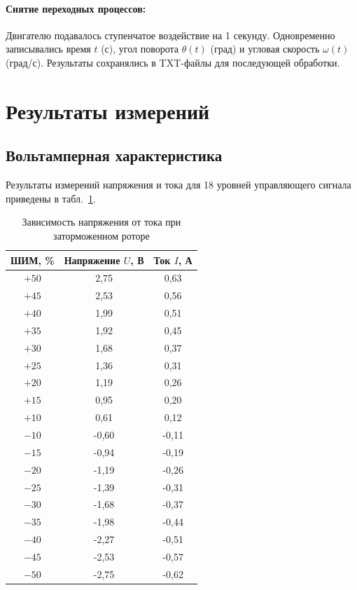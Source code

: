 \documentclass[a4paper, 12pt]{article}
\begin{document}
\paragraph{Снятие переходных процессов:}
Двигателю подавалось ступенчатое воздействие на 1 секунду. Одновременно записывались время $t$ (с), угол поворота $\theta(t)$ (град) и угловая скорость $\omega(t)$ (град/с). Результаты сохранялись в TXT-файлы для последующей обработки.

\section{Результаты измерений}

\subsection{Вольтамперная характеристика}

Результаты измерений напряжения и тока для 18 уровней управляющего сигнала приведены в табл.~\ref{tab:ui}.

\begin{table}[H]
    \centering
    \caption{Зависимость напряжения от тока при заторможенном роторе}
    \label{tab:ui}
    \begin{tabular}{|c|c|c|}
        \hline
        \textbf{ШИМ, \%} & \textbf{Напряжение $U$, В} & \textbf{Ток $I$, А} \\
        \hline
        $+50$  &  2,75 &  0,63 \\
        $+45$  &  2,53 &  0,56 \\
        $+40$  &  1,99 &  0,51 \\
        $+35$  &  1,92 &  0,45 \\
        $+30$  &  1,68 &  0,37 \\
        $+25$  &  1,36 &  0,31 \\
        $+20$  &  1,19 &  0,26 \\
        $+15$  &  0,95 &  0,20 \\
        $+10$  &  0,61 &  0,12 \\
        \hline
        $-10$  & -0,60 & -0,11 \\
        $-15$  & -0,94 & -0,19 \\
        $-20$  & -1,19 & -0,26 \\
        $-25$  & -1,39 & -0,31 \\
        $-30$  & -1,68 & -0,37 \\
        $-35$  & -1,98 & -0,44 \\
        $-40$  & -2,27 & -0,51 \\
        $-45$  & -2,53 & -0,57 \\
        $-50$  & -2,75 & -0,62 \\
        \hline
    \end{tabular}
\end{table}
\end{document}
